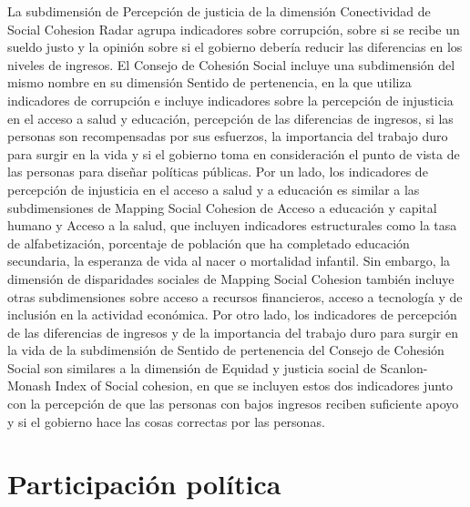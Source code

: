 \documentclass[
  12pt,
]{book}
\begin{document}
La subdimensión de Percepción de justicia de la dimensión Conectividad de Social Cohesion Radar agrupa indicadores sobre corrupción, sobre si se recibe un sueldo justo y la opinión sobre si el gobierno debería reducir las diferencias en los niveles de ingresos. El Consejo de Cohesión Social incluye una subdimensión del mismo nombre en su dimensión Sentido de pertenencia, en la que utiliza indicadores de corrupción e incluye indicadores sobre la percepción de injusticia en el acceso a salud y educación, percepción de las diferencias de ingresos, si las personas son recompensadas por sus esfuerzos, la importancia del trabajo duro para surgir en la vida y si el gobierno toma en consideración el punto de vista de las personas para diseñar políticas públicas. Por un lado, los indicadores de percepción de injusticia en el acceso a salud y a educación es similar a las subdimensiones de Mapping Social Cohesion de Acceso a educación y capital humano y Acceso a la salud, que incluyen indicadores estructurales como la tasa de alfabetización, porcentaje de población que ha completado educación secundaria, la esperanza de vida al nacer o mortalidad infantil. Sin embargo, la dimensión de disparidades sociales de Mapping Social Cohesion también incluye otras subdimensiones sobre acceso a recursos financieros, acceso a tecnología y de inclusión en la actividad económica. Por otro lado, los indicadores de percepción de las diferencias de ingresos y de la importancia del trabajo duro para surgir en la vida de la subdimensión de Sentido de pertenencia del Consejo de Cohesión Social son similares a la dimensión de Equidad y justicia social de Scanlon-Monash Index of Social cohesion, en que se incluyen estos dos indicadores junto con la percepción de que las personas con bajos ingresos reciben suficiente apoyo y si el gobierno hace las cosas correctas por las personas.

\hypertarget{participaciuxf3n-poluxedtica}{%
\section{Participación política}\label{participaciuxf3n-poluxedtica}}
\end{document}
